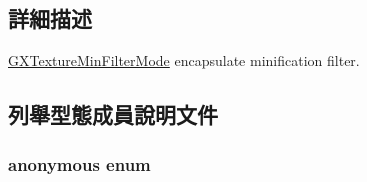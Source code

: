 \subsection{詳細描述}
\hyperlink{class_i_dream_sky_1_1_g_x_texture_min_filter_mode}{G\+X\+Texture\+Min\+Filter\+Mode} encapsulate minification filter. 

\subsection{列舉型態成員說明文件}
\subsubsection[{\texorpdfstring{anonymous enum}{anonymous enum}}]{\setlength{\rightskip}{0pt plus 5cm}anonymous enum}\hypertarget{class_i_dream_sky_1_1_g_x_texture_min_filter_mode_a53c413523e4864a1449a6d35f597d169}{}\label{class_i_dream_sky_1_1_g_x_texture_min_filter_mode_a53c413523e4864a1449a6d35f597d169}
